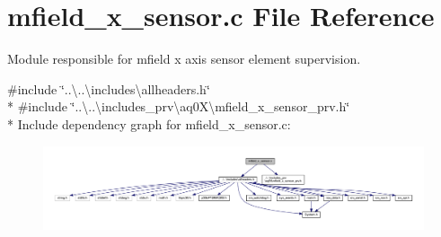 \hypertarget{a00050}{\section{mfield\+\_\+x\+\_\+sensor.\+c File Reference}
\label{a00050}
}


Module responsible for mfield x axis sensor element supervision.  


{\ttfamily \#include \char`\"{}..\textbackslash{}..\textbackslash{}includes\textbackslash{}allheaders.\+h\char`\"{}}\\*
{\ttfamily \#include \char`\"{}..\textbackslash{}..\textbackslash{}includes\+\_\+prv\textbackslash{}aq0\+X\textbackslash{}mfield\+\_\+x\+\_\+sensor\+\_\+prv.\+h\char`\"{}}\\*
Include dependency graph for mfield\+\_\+x\+\_\+sensor.\+c\+:\nopagebreak
\begin{figure}[H]
\begin{center}
\leavevmode
\includegraphics[width=350pt]{da/d17/a00964}
\end{center}
\end{figure}
